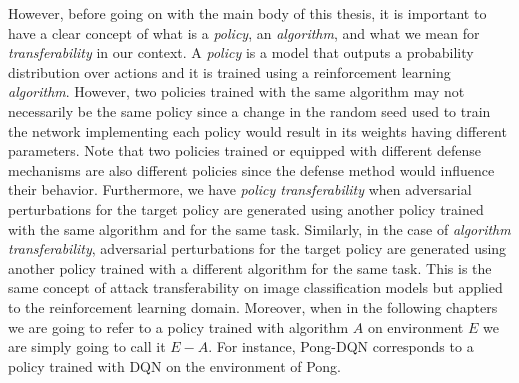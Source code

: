 However, before going on with the main body of this thesis, it is important to have a clear concept of what is a {\it policy}, an {\it algorithm}, and what we mean for {\it transferability} in our context. A {\it policy} is a model that outputs a probability distribution over actions and it is trained using a reinforcement learning {\it algorithm}. However, two policies trained with the same algorithm may not necessarily be the same policy since a change in the random seed used to train the network implementing each policy would result in its weights having different parameters. Note that two policies trained or equipped with different defense mechanisms are also different policies since the defense method would influence their behavior. Furthermore, we have {\it policy transferability} when adversarial perturbations for the target policy are generated using another policy trained with the same algorithm and for the same task. Similarly, in the case of {\it algorithm transferability}, adversarial perturbations for the target policy are generated using another policy trained with a different algorithm for the same task. This is the same concept of attack transferability on image classification models but applied to the reinforcement learning domain. Moreover, when in the following chapters we are going to refer to a policy trained with algorithm \(A\) on environment \(E\) we are simply going to call it \(E-A\). For instance, Pong-DQN corresponds to a policy trained with DQN on the environment of Pong.

